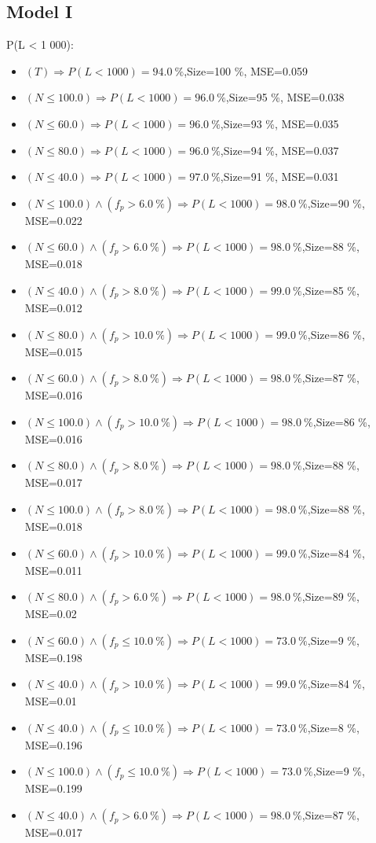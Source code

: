 \documentclass[numbered]{CSL}
\begin{document}
\subsection{Model I}
P(L < 1 000):
\begin{itemize}
\item $(T) \Rightarrow P(L < 1 000) = 94.0~\%$,\hfill Size=100 \%, MSE=0.059
\item $(N \leq 100.0) \Rightarrow P(L < 1 000) = 96.0~\%$,\hfill Size=95 \%, MSE=0.038
\item $(N \leq 60.0) \Rightarrow P(L < 1 000) = 96.0~\%$,\hfill Size=93 \%, MSE=0.035
\item $(N \leq 80.0) \Rightarrow P(L < 1 000) = 96.0~\%$,\hfill Size=94 \%, MSE=0.037
\item $(N \leq 40.0) \Rightarrow P(L < 1 000) = 97.0~\%$,\hfill Size=91 \%, MSE=0.031
\item $(N \leq 100.0) \land (f_p > 6.0~\%) \Rightarrow P(L < 1 000) = 98.0~\%$,\hfill Size=90 \%, MSE=0.022
\item $(N \leq 60.0) \land (f_p > 6.0~\%) \Rightarrow P(L < 1 000) = 98.0~\%$,\hfill Size=88 \%, MSE=0.018
\item $(N \leq 40.0) \land (f_p > 8.0~\%) \Rightarrow P(L < 1 000) = 99.0~\%$,\hfill Size=85 \%, MSE=0.012
\item $(N \leq 80.0) \land (f_p > 10.0~\%) \Rightarrow P(L < 1 000) = 99.0~\%$,\hfill Size=86 \%, MSE=0.015
\item $(N \leq 60.0) \land (f_p > 8.0~\%) \Rightarrow P(L < 1 000) = 98.0~\%$,\hfill Size=87 \%, MSE=0.016
\item $(N \leq 100.0) \land (f_p > 10.0~\%) \Rightarrow P(L < 1 000) = 98.0~\%$,\hfill Size=86 \%, MSE=0.016
\item $(N \leq 80.0) \land (f_p > 8.0~\%) \Rightarrow P(L < 1 000) = 98.0~\%$,\hfill Size=88 \%, MSE=0.017
\item $(N \leq 100.0) \land (f_p > 8.0~\%) \Rightarrow P(L < 1 000) = 98.0~\%$,\hfill Size=88 \%, MSE=0.018
\item $(N \leq 60.0) \land (f_p > 10.0~\%) \Rightarrow P(L < 1 000) = 99.0~\%$,\hfill Size=84 \%, MSE=0.011
\item $(N \leq 80.0) \land (f_p > 6.0~\%) \Rightarrow P(L < 1 000) = 98.0~\%$,\hfill Size=89 \%, MSE=0.02
\item $(N \leq 60.0) \land (f_p \leq 10.0~\%) \Rightarrow P(L < 1 000) = 73.0~\%$,\hfill Size=9 \%, MSE=0.198
\item $(N \leq 40.0) \land (f_p > 10.0~\%) \Rightarrow P(L < 1 000) = 99.0~\%$,\hfill Size=84 \%, MSE=0.01
\item $(N \leq 40.0) \land (f_p \leq 10.0~\%) \Rightarrow P(L < 1 000) = 73.0~\%$,\hfill Size=8 \%, MSE=0.196
\item $(N \leq 100.0) \land (f_p \leq 10.0~\%) \Rightarrow P(L < 1 000) = 73.0~\%$,\hfill Size=9 \%, MSE=0.199
\item $(N \leq 40.0) \land (f_p > 6.0~\%) \Rightarrow P(L < 1 000) = 98.0~\%$,\hfill Size=87 \%, MSE=0.017
\end{itemize}
\end{document}
